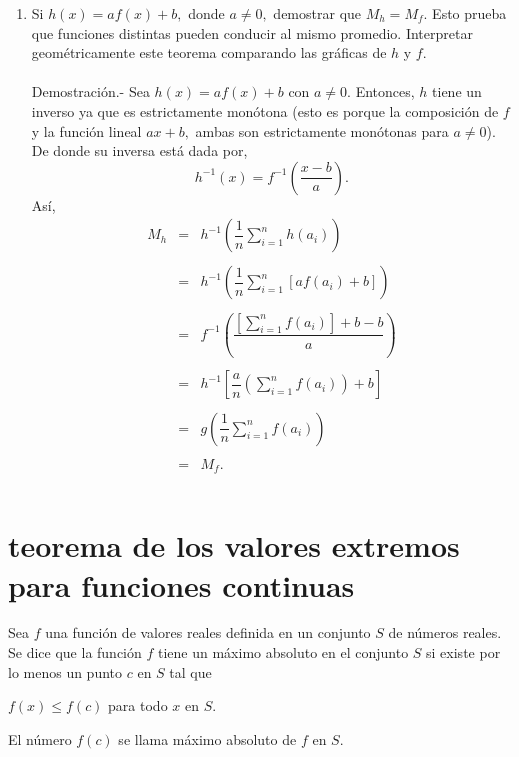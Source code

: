\begin{enumerate}[\bfseries 1.]
    \item Si $h(x)=af(x)+b,$ donde $a\neq 0,$ demostrar que $M_h=M_f$. Esto prueba que funciones distintas pueden conducir al mismo promedio. Interpretar geométricamente este teorema comparando las gráficas de $h$ y $f.$\\\\
	Demostración.-\; Sea $h(x)=af(x)+b$ con $a\neq 0$. Entonces, $h$ tiene un inverso ya que es estrictamente monótona (esto es porque la composición de $f$ y la función lineal $ax+b,$ ambas son estrictamente monótonas para $a\neq 0$). De donde su inversa está dada por,
	$$h^{-1}(x)=f^{-1}\left(\dfrac{x-b}{a}\right).$$
	Así,
	$$\begin{array}{rcl}
	    M_h &=& h^{-1}\left(\dfrac{1}{n}\sum_{i=1}^n h(a_i)\right)\\\\
		&=& h^{-1}\left(\dfrac{1}{n}\sum_{i=1}^n [af(a_i)+b]\right)\\\\
		&=&f^{-1} \left(\dfrac{\left[\sum_{i=1}^n f(a_i)\right]+b-b}{a}\right)\\\\
		&=& h^{-1}\left[\dfrac{a}{n}\left(\sum_{i=1}^n f(a_i)\right)+b\right]\\\\
		&=& g\left(\dfrac{1}{n}\sum_{i=1}^n f(a_i)\right)\\\\
		&=& M_f.\\\\
	\end{array}$$

\end{enumerate}


\section{teorema de los valores extremos para funciones continuas}

\begin{tcolorbox}
    \begin{def.}
	Sea $f$ una función de valores reales definida en un conjunto $S$ de números reales. Se dice que la función $f$ tiene un máximo absoluto en el conjunto $S$ si existe por lo menos un punto $c$ en $S$ tal que 
	\begin{center}
	    $f(x)\leq f(c)$ para todo $x$ en $S$.
	\end{center}
	El número $f(c)$ se llama máximo absoluto de $f$ en $S$. 
    \end{def.}
\end{tcolorbox}

